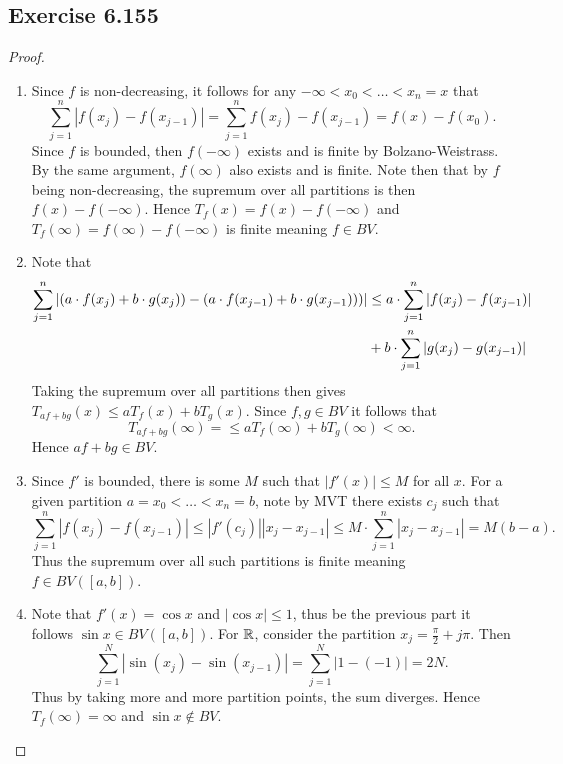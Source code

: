 \documentclass[hw_all.tex]{subfiles}
\begin{document}
\subsection{Exercise 6.155}
\begin{proof}
    \begin{enumerate}
        \item 
            Since $f$ is non-decreasing, it follows for any $-\infty < x_0 < \ldots < x_n = x$ that
            \[
                \sum_{j=1}^n |f(x_j) - f(x_{j-1})| = \sum_{j=1}^n f(x_j) - f(x_{j-1}) = f(x) - f(x_0)
            .\]
            Since $f$ is bounded, then $f(-\infty)$ exists and is finite by Bolzano-Weistrass. By the same argument, $f(\infty)$ also exists and is finite. Note then that by $f$ being non-decreasing, the supremum over all partitions is then $f(x) - f(-\infty)$. Hence $T_f(x) = f(x) - f(-\infty)$ and $T_f(\infty) = f(\infty) - f(-\infty)$ is finite meaning $f \in BV$.

        \item 
            Note that
            \begin{align*}
                \sum_{j=1}^n \qty|(a \cdot f(x_j) + b \cdot g(x_j)) - (a \cdot f(x_{j-1}) + b \cdot g(x_{j-1})))| &\leq a \cdot \sum_{j=1}^n |f(x_j) - f(x_{j-1})| \\
                                                                                                                  &+ b \cdot \sum_{j = 1}^n |g(x_j) - g(x_{j-1})|
            \end{align*}
            Taking the supremum over all partitions then gives $T_{af + bg}(x) \leq a T_f(x) + b T_g(x)$. Since $f, g \in BV$ it follows that
            \[
                T_{af+ bg}(\infty) = \leq a T_f(\infty) + b T_g(\infty) < \infty
            .\]
            Hence $af + bg \in BV$.

        \item
            Since $f'$ is bounded, there is some $M$ such that $|f'(x)| \leq M$ for all $x$. For a given partition $a = x_0 < \ldots < x_n = b$, note by MVT there exists $c_j$ such that
            \[
                \sum_{j = 1}^n |f(x_j) - f(x_{j-1})| \leq |f'(c_j)| |x_j - x_{j - 1}| \leq M \cdot \sum_{j = 1}^n |x_j - x_{j-1}| = M(b - a)
            .\]
            Thus the supremum over all such partitions is finite meaning $f \in BV([a,b])$.

        \item 
            Note that $f'(x) = \cos x$ and $|\cos x| \leq 1$, thus be the previous part it follows $\sin x \in BV([a,b])$. For $\mathbb{R}$, consider the partition $x_j = \frac{\pi}{2} + j \pi$. Then
            \[
                \sum_{j = 1}^N |\sin(x_j) - \sin(x_{j-1})| = \sum_{j = 1}^N |1 - (-1)| = 2N
            .\]
            Thus by taking more and more partition points, the sum diverges. Hence $T_f(\infty) = \infty$ and $\sin x \notin BV$.


\end{enumerate}
\end{proof}
\end{document}
